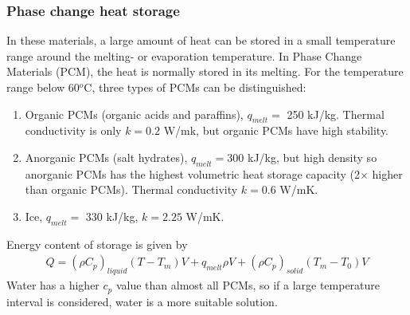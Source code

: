 \documentclass[a4paper,10pt]{article}
\begin{document}
\subsubsection{Phase change heat storage}
In these materials, a large amount of heat can be stored in a small temperature range around the melting- or evaporation temperature. In Phase Change Materials (PCM), the heat is normally stored in its melting. For the temperature range below 60$^o$C, three types of PCMs can be distinguished:
\begin{enumerate}
 \item Organic PCMs (organic acids and paraffins), $q_{melt} = $ 250 kJ/kg. Thermal conductivity is only $k = 0.2$ W/mk, but organic PCMs have high stability.
 \item Anorganic PCMs (salt hydrates), $q_{melt} = 300 $ kJ/kg, but high density so anorganic PCMs has the highest volumetric heat storage capacity (2$\times$ higher than organic PCMs). Thermal conductivity $k = 0.6$ W/mK.
 \item Ice, $q_{melt} = $ 330 kJ/kg, $k = 2.25$ W/mK.
\end{enumerate}
Energy content of storage is given by
\begin{align}
 Q = (\rho C_p)_{liquid} (T-T_m) V + q_{melt} \rho V + (\rho C_p)_{solid} (T_m - T_0)V
\end{align}
Water has a higher $c_p$ value than almost all PCMs, so if a large temperature interval is considered, water is a more suitable solution.
\end{document}
